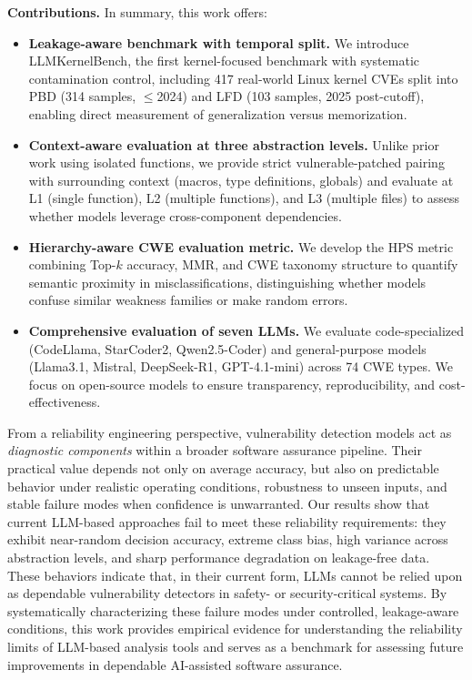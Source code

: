 \documentclass[lettersize,journal]{IEEEtran}
\begin{document}
\textbf{Contributions.} In summary, this work offers:
\begin{itemize}
    \item \textbf{Leakage-aware benchmark with temporal split.} We introduce LLMKernelBench, the first kernel-focused benchmark with systematic contamination control, including 417 real-world Linux kernel CVEs split into PBD (314 samples, $\leq$2024) and LFD (103 samples, 2025 post-cutoff), enabling direct measurement of generalization versus memorization.

    \item \textbf{Context-aware evaluation at three abstraction levels.} Unlike prior work using isolated functions, we provide strict vulnerable-patched pairing with surrounding context (macros, type definitions, globals) and evaluate at L1 (single function), L2 (multiple functions), and L3 (multiple files) to assess whether models leverage cross-component dependencies.

    \item \textbf{Hierarchy-aware CWE evaluation metric.} We develop the \gls{HPS} metric combining Top-$k$ accuracy, \gls{MMR}, and CWE taxonomy structure to quantify semantic proximity in misclassifications, distinguishing whether models confuse similar weakness families or make random errors.

    \item \textbf{Comprehensive evaluation of seven LLMs.} We evaluate code-specialized (CodeLlama, StarCoder2, Qwen2.5-Coder) and general-purpose models (Llama3.1, Mistral, DeepSeek-R1, GPT-4.1-mini) across 74 CWE types. We focus on open-source models to ensure transparency, reproducibility, and cost-effectiveness.

\end{itemize}

From a reliability engineering perspective, vulnerability detection models act as \emph{diagnostic components} within a broader software assurance pipeline. Their practical value depends not only on average accuracy, but also on predictable behavior under realistic operating conditions, robustness to unseen inputs, and stable failure modes when confidence is unwarranted. Our results show that current LLM-based approaches fail to meet these reliability requirements: they exhibit near-random decision accuracy, extreme class bias, high variance across abstraction levels, and sharp performance degradation on leakage-free data. These behaviors indicate that, in their current form, LLMs cannot be relied upon as dependable vulnerability detectors in safety- or security-critical systems. By systematically characterizing these failure modes under controlled, leakage-aware conditions, this work provides empirical evidence for understanding the reliability limits of LLM-based analysis tools and serves as a benchmark for assessing future improvements in dependable AI-assisted software assurance.
\end{document}
